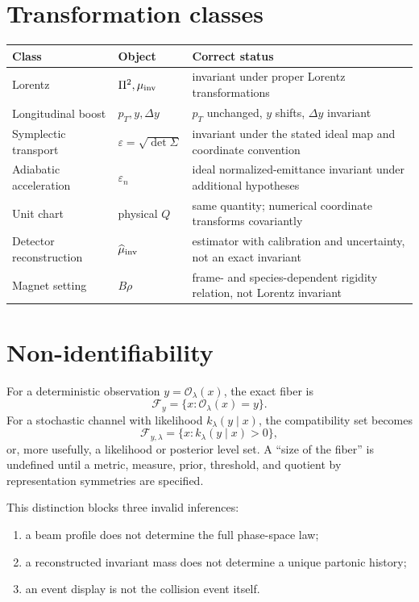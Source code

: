 \documentclass[11pt,a4paper]{article}
\theoremstyle{definition}
\theoremstyle{plain}
\theoremstyle{remark}
\newcommand{\Ocal}{\mathcal O}
\newcommand{\Fcal}{\mathcal F}
\begin{document}
\section{Transformation classes}

\begin{longtable}{@{}L{37mm}L{43mm}L{67mm}@{}}
\toprule
Class & Object & Correct status \\
\midrule
\endhead
Lorentz &
\(\Pi^2,\mu_{\rm inv}\) &
invariant under proper Lorentz transformations \\
Longitudinal boost &
\(p_T,y,\Delta y\) &
\(p_T\) unchanged, \(y\) shifts, \(\Delta y\) invariant \\
Symplectic transport &
\(\varepsilon=\sqrt{\det\Sigma}\) &
invariant under the stated ideal map and coordinate convention \\
Adiabatic acceleration &
\(\varepsilon_n\) &
ideal normalized-emittance invariant under additional hypotheses \\
Unit chart &
physical \(Q\) &
same quantity; numerical coordinate transforms covariantly \\
Detector reconstruction &
\(\widehat\mu_{\rm inv}\) &
estimator with calibration and uncertainty, not an exact invariant \\
Magnet setting &
\(B\rho\) &
frame- and species-dependent rigidity relation, not Lorentz invariant \\
\bottomrule
\end{longtable}

\section{Non-identifiability}

For a deterministic observation \(y=\Ocal_\lambda(x)\), the exact
fiber is
\[
\Fcal_y=\{x:\Ocal_\lambda(x)=y\}.
\]
For a stochastic channel with likelihood \(k_\lambda(y\mid x)\), the
compatibility set becomes
\[
\Fcal_{y,\lambda}
=\{x:k_\lambda(y\mid x)>0\},
\]
or, more usefully, a likelihood or posterior level set. A ``size of
the fiber'' is undefined until a metric, measure, prior, threshold,
and quotient by representation symmetries are specified.

This distinction blocks three invalid inferences:
\begin{enumerate}[label=(\roman*)]
  \item a beam profile does not determine the full phase-space law;
  \item a reconstructed invariant mass does not determine a unique
  partonic history;
  \item an event display is not the collision event itself.
\end{enumerate}
\end{document}
